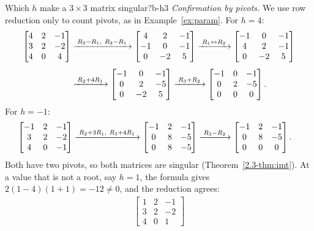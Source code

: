 \documentclass[11pt]{article}
\begin{document}
\begin{exmp}{Which $h$ make a $3\times3$ matrix singular?}{b-h3}
\emph{Confirmation by pivots.} We use row reduction only to count pivots, as in Example~\ref{ex:param}. For $h=4$:
\begin{align*}
\begin{bmatrix}4&2&-1\\3&2&-2\\4&0&4\end{bmatrix}
&\xrightarrow{\;R_2-R_1,\ R_3-R_1\;}
\begin{bmatrix}4&2&-1\\-1&0&-1\\0&-2&5\end{bmatrix}
\xrightarrow{\;R_1\leftrightarrow R_2\;}
\begin{bmatrix}-1&0&-1\\4&2&-1\\0&-2&5\end{bmatrix}\\[4pt]
&\xrightarrow{\;R_2+4R_1\;}
\begin{bmatrix}-1&0&-1\\0&2&-5\\0&-2&5\end{bmatrix}
\xrightarrow{\;R_3+R_2\;}
\begin{bmatrix}-1&0&-1\\0&2&-5\\0&0&0\end{bmatrix}.
\end{align*}
For $h=-1$:
\begin{align*}
\begin{bmatrix}-1&2&-1\\3&2&-2\\4&0&-1\end{bmatrix}
&\xrightarrow{\;R_2+3R_1,\ R_3+4R_1\;}
\begin{bmatrix}-1&2&-1\\0&8&-5\\0&8&-5\end{bmatrix}
\xrightarrow{\;R_3-R_2\;}
\begin{bmatrix}-1&2&-1\\0&8&-5\\0&0&0\end{bmatrix}.
\end{align*}
Both have two pivots, so both matrices are singular (Theorem~\ref{2.3-thm:imt}). At a value that is not a root, say $h=1$, the formula gives $2(1-4)(1+1)=-12\neq0$, and the reduction agrees:
\begin{align*}
\begin{bmatrix}1&2&-1\\3&2&-2\\4&0&1\end{bmatrix}

\end{align*}
\end{exmp}
\end{document}

